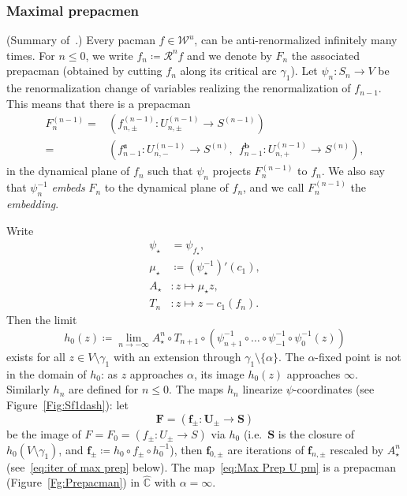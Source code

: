 \documentclass{amsart}
\renewcommand{\sp}{{\ \ }}
\newcommand{\1}{{\mathbb 1 }}
\newcommand\RR{\mathcal{R}}
\newcommand{\bF}{{\mathbf F}}
\newcommand{\bS}{{\mathbf S}}
\newcommand{\bU}{{\mathbf U}}
\newcommand{\bbf}{{\mathbf f}}
\newcommand{\str}{{\star}}
\renewcommand{\aa}{\mathfrak{a}}
\newcommand{\bb}{{\mathbf b}}
\newcommand\WW{\mathcal{W}}
\newcommand{\wC}{\widehat{\mathbb{C}}}
\theoremstyle{remark}
\numberwithin{equation}{section}
\theoremstyle{definition}
\theoremstyle{nonumberbreak}
\begin{document}
\subsubsection{Maximal prepacmen}(Summary of~\cite[\S5]{DLS}.)
\label{sss:max prepacmen}
Every pacman $f\in \WW^u$, can be anti-renormalized infinitely many times. For $n\le 0$, we write $f_n\coloneqq \RR^{n} f$ and we denote by $F_n$ the associated prepacman (obtained by cutting $f_n$ along its critical arc $\gamma_1$). Let $\psi_{n}\colon S_n\to V$ be the renormalization change of variables realizing the renormalization of $f_{n-1}$. This means that there is a prepacman 
\begin{align*}
 F^{(n-1)}_n= &\left(f^{(n-1)}_{n,\pm }\colon U^{(n-1)}_{n,\pm}\to S^{(n-1)}\right)\\=& \left(f^{\aa}_{n-1}\colon U^{(n-1)}_{n,-}\to S^{(n)},\sp f^{\bb}_{n-1}\colon U^{(n-1)}_{n,+}\to S^{(n)}\right),
\end{align*}
in the dynamical plane of $f_n$ such that $\psi_{n}$ projects $F^{(n-1)}_n$ to $f_n$. We also say that $\psi_{n}^{-1}$ \emph{embeds} $F_n$ to the dynamical plane of $f_{n}$, and we call $F_{n}^{(n-1)}$ the \emph{embedding}.


Write 
\begin{align*}
\psi_{\str}&=\psi_{f_\str},\\
\mu_{\str}&\coloneqq \left(\psi^{-1}_{\str}\right)' (c_1),\\
A_\str&\colon  z\mapsto \mu_{\str} z,\\
T_n&\colon z\mapsto z-c_1(f_n).
 \end{align*}
Then the limit 
\begin{equation}
\label{eq:h_0:defn}
h_0(z)\coloneqq \lim_{n\to -\infty} A_{\str}^{n}\circ T_{n+1} \circ \left(\psi_{n+1}^{-1}\circ \dots \circ \psi_{-1}^{-1}\circ\psi _0^{-1} (z)\right)
\end{equation}
exists for all $z\in V\setminus \gamma_1$ with an extension through $\gamma_1\setminus \{\alpha\}$. The $\alpha$-fixed point is not in the domain of $h_0$: as $z$ approaches $\alpha$, its image $h_0(z)$ approaches $\infty$. Similarly $h_n$ are defined for $n\le 0$. The maps $h_n$ linearize $\psi$-coordinates (see Figure~\ref{Fig:Sf1dash}):
let 
\begin{equation}
\label{eq:Max Prep U pm}
\bF= (\bbf_{\pm}\colon \bU_{\pm }\to \bS)
\end{equation}
 be the image of $F=F_0=(f_\pm \colon U_\pm \to S)$ via $h_0$ (i.e.~$\bS $ is the closure of $h_0 (V\setminus \gamma_1)$, and $\bbf_{\pm}\coloneqq h_0 \circ f_{\pm} \circ h_0^{-1}$), then $\bbf_{0,\pm}$ are iterations of $\bbf_{n,\pm}$ rescaled by $A^{n}_\str$ (see~\eqref{eq:iter of max prep} below). The map~\eqref{eq:Max Prep U pm} is a prepacman (Figure~\ref{Fg:Prepacman}) in $\wC$ with $\alpha=\infty$.
\end{document}
